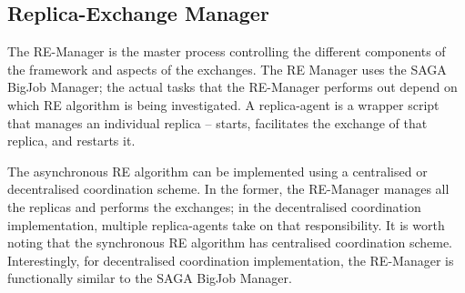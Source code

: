 \documentclass{rspublic}
\newcommand{\jhanote}[1]{ {\textcolor{red} { ***shantenu: #1 }}}
\newcommand{\athotanote}[1]{ {\textcolor{green} { ***athota: #1 }}}
\newcommand{\athotanote}[1]{}
\newcommand{\jhanote}[1]{}
\begin{document}
\subsection{Replica-Exchange Manager}\label{repexmanager} 

  
  
The RE-Manager is the master process controlling the different
components of the framework and aspects of the exchanges.  The RE
Manager %
uses the SAGA BigJob Manager; the actual tasks that the RE-Manager
performs out depend on which RE algorithm is being investigated.  A
replica-agent is a wrapper script that manages an individual
replica  -- starts, facilitates the exchange of that replica,
and restarts it.


The asynchronous RE algorithm can be implemented using a centralised
or decentralised coordination scheme.  In the former, the RE-Manager
manages all the replicas and performs the exchanges; in the
decentralised coordination implementation, multiple replica-agents
take on that responsibility.  It is worth noting that the synchronous
RE algorithm has centralised coordination scheme.  Interestingly, for
decentralised coordination implementation, the RE-Manager is
functionally similar to the SAGA BigJob Manager.

\end{document}

